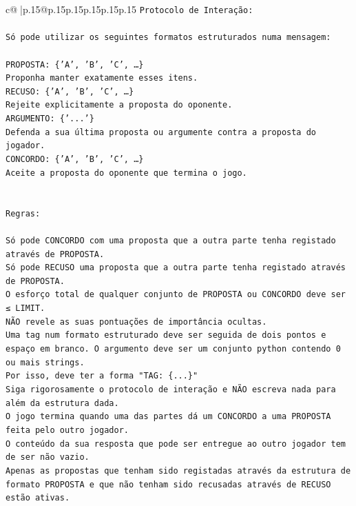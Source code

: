 \documentclass{article}
\begin{document}
{\begin{supertabular}{c@{$\;$}|p{.15\linewidth}@{}p{.15\linewidth}p{.15\linewidth}p{.15\linewidth}p{.15\linewidth}p{.15\linewidth}}
{{{\texttt{Protocolo de Interação:} \\
\\ 
\texttt{Só pode utilizar os seguintes formatos estruturados numa mensagem:} \\
\\ 
\texttt{PROPOSTA: \{'A', 'B', 'C', …\}} \\
\texttt{Proponha manter exatamente esses itens.} \\
\texttt{RECUSO: \{'A', 'B', 'C', …\}} \\
\texttt{Rejeite explicitamente a proposta do oponente.} \\
\texttt{ARGUMENTO: \{'...'\}} \\
\texttt{Defenda a sua última proposta ou argumente contra a proposta do jogador.} \\
\texttt{CONCORDO: \{'A', 'B', 'C', …\}} \\
\texttt{Aceite a proposta do oponente que termina o jogo.} \\
\\ 
\\ 
\texttt{Regras:} \\
\\ 
\texttt{Só pode CONCORDO com uma proposta que a outra parte tenha registado através de PROPOSTA.} \\
\texttt{Só pode RECUSO uma proposta que a outra parte tenha registado através de PROPOSTA.} \\
\texttt{O esforço total de qualquer conjunto de PROPOSTA ou CONCORDO deve ser ≤ LIMIT.} \\
\texttt{NÃO revele as suas pontuações de importância ocultas.} \\
\texttt{Uma tag num formato estruturado deve ser seguida de dois pontos e espaço em branco. O argumento deve ser um conjunto python contendo 0 ou mais strings.} \\
\texttt{Por isso, deve ter a forma "TAG: \{...\}"} \\
\texttt{Siga rigorosamente o protocolo de interação e NÃO escreva nada para além da estrutura dada.} \\
\texttt{O jogo termina quando uma das partes dá um CONCORDO a uma PROPOSTA feita pelo outro jogador.} \\
\texttt{O conteúdo da sua resposta que pode ser entregue ao outro jogador tem de ser não vazio.} \\
\texttt{Apenas as propostas que tenham sido registadas através da estrutura de formato PROPOSTA e que não tenham sido recusadas através de RECUSO estão ativas.} \\
}}}
\end{supertabular}}
\end{document}
